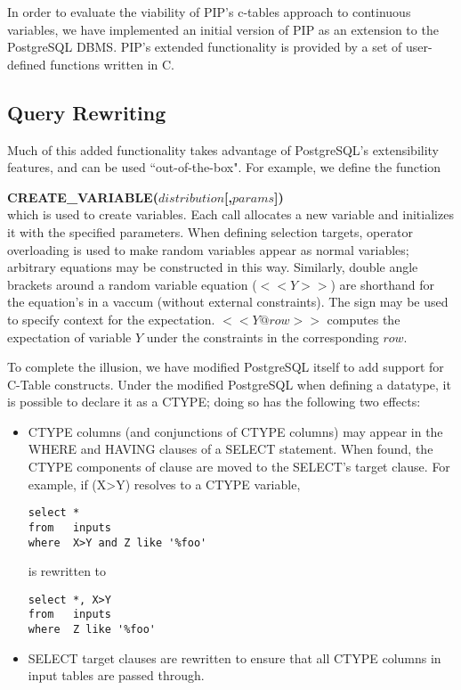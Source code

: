 In order to evaluate the viability of PIP's c-tables approach to continuous variables, we have implemented an initial version of PIP as an extension to the PostgreSQL DBMS.  PIP's extended functionality is provided by a set of user-defined functions written in C.  

\subsection{Query Rewriting}
Much of this added functionality takes advantage of PostgreSQL's extensibility features, and can be used ``out-of-the-box".  For example, we define the function 

\textbf{CREATE\_VARIABLE($distribution$[,$params$])} \\
which is used to create variables.  Each call allocates a new variable and initializes it with the specified parameters.  When defining selection targets, operator overloading is used to make random variables appear as normal variables; arbitrary equations may be constructed in this way.  Similarly, double angle brackets around a random variable equation ($\lt\lt Y \gt \gt$) are shorthand for the equation's in a vaccum (without external constraints).  The \@ sign may be used to specify context for the expectation.  $\lt\lt Y @ row \gt\gt$ computes the expectation of variable $Y$ under the constraints in the corresponding $row$.


To complete the illusion, we have modified PostgreSQL itself to add support for C-Table constructs.  Under the modified PostgreSQL when defining a datatype, it is possible to declare it as a CTYPE; doing so has the following two effects:
\begin{itemize}
\item CTYPE columns (and conjunctions of CTYPE columns) may appear in the WHERE and HAVING clauses of a SELECT statement.  When found, the CTYPE components of clause are moved to the SELECT's target clause.  For example, if (X>Y) resolves to a CTYPE variable, 
\begin{verbatim}
select *
from   inputs
where  X>Y and Z like '%foo'
\end{verbatim}
is rewritten to
\begin{verbatim}
select *, X>Y
from   inputs
where  Z like '%foo'
\end{verbatim}

\item SELECT target clauses are rewritten to ensure that all CTYPE columns in input tables are passed through.
\end{itemize}

